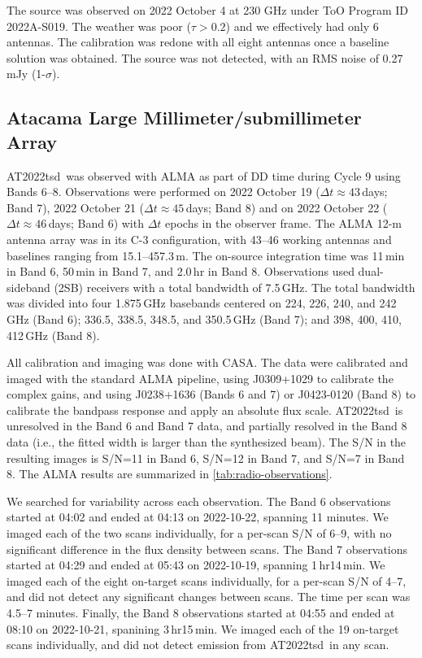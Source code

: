 \documentclass{nature_plusfigure}
\newcommand{\at}{AT2022tsd}
\begin{document}
\begin{methods}
The source was observed on 2022 October 4 at 230 GHz under ToO Program ID 2022A-S019.
The weather was poor ($\tau > 0.2$) and we effectively had only 6 antennas. The calibration was redone with all eight antennas once a baseline solution was obtained. The source was not detected, with an RMS noise of 0.27\,mJy (1-$\sigma$).

\subsection{Atacama Large Millimeter/submillimeter Array}
\label{sec:ALMA}

\at\ was observed with ALMA as part of DD time during Cycle 9 using Bands 6--8. Observations were performed on 2022 October 19 ($\Delta t \approx 43$\,days; Band 7), 2022 October 21 ($\Delta t \approx 45$\,days; Band 8) and on 2022 October 22 ($\Delta t \approx 46$\,days; Band 6) with $\Delta t$ epochs in the observer frame. The ALMA 12-m antenna array was in its C-3 configuration, with
43--46 working antennas and baselines ranging from 15.1--457.3\,m. The on-source integration time was
11\,min in Band 6, 50\,min in Band 7, and 2.0\,hr in Band 8.
Observations used dual-sideband (2SB) receivers with a total bandwidth of 7.5\,GHz. The total bandwidth was divided into four 1.875\,GHz basebands centered on 224, 226, 240, and 242\,GHz (Band 6);
336.5, 338.5, 348.5, and 350.5\,GHz (Band 7);
and 398, 400, 410, 412\,GHz (Band 8).


All calibration and imaging was done with CASA.
The data were calibrated and imaged
with the standard ALMA pipeline, using J0309+1029 to calibrate the complex gains, and using J0238+1636 (Bands 6 and 7) or J0423-0120 (Band 8) to calibrate the bandpass response and apply an absolute flux scale.
\at\ is unresolved in the Band 6 and Band 7 data, and partially resolved in the Band 8 data (i.e., the fitted width is larger than the synthesized beam).
The S/N in the resulting images is S/N=11 in Band 6, S/N=12 in Band 7, and S/N=7 in Band 8.
The ALMA results are summarized in \ref{tab:radio-observations}.

We searched for variability across each observation. The Band 6 observations started at 04:02 and ended at 04:13 on 2022-10-22, spanning 11 minutes. We imaged each of the two scans individually, for a per-scan S/N of 6--9, with no significant difference in the flux density between scans.
The Band 7 observations started at 04:29 and ended at 05:43 on 2022-10-19, spanning 1\,hr14\,min.
We imaged each of the eight on-target scans individually, for a per-scan S/N of 4--7, and did not detect any significant changes between scans. The time per scan was 4.5--7 minutes.
Finally, the Band 8 observations started at 04:55 and ended at 08:10 on 2022-10-21, spanining 3\,hr15\,min. We imaged each of the 19 on-target scans individually, and did not detect emission from \at\ in any scan.


\end{methods}
\end{document}
